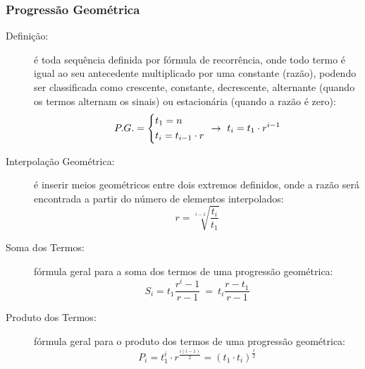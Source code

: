     \subsubsection{Progressão Geométrica}
        \begin{description}
            \item[Definição:] é toda sequência definida por fórmula de recorrência, onde todo termo é igual ao seu antecedente multiplicado por uma constante (razão), podendo ser classificada como crescente, constante, decrescente, alternante (quando os termos alternam os sinais) ou estacionária (quando a razão é zero):
            \[ P.G. = \begin{dcases} t_1 = n \\ t_i = t_{i-1} \cdot r \end{dcases} \ \rightarrow \ t_i = t_1 \cdot r^{i-1} \]
            \item[Interpolação Geométrica:] é inserir meios geométricos entre dois extremos definidos, onde a razão será encontrada a partir do número de elementos interpolados:
            \[ r = \sqrt[i-1]{\frac{t_i}{t_1}} \]
            \item[Soma dos Termos:] fórmula geral para a soma dos termos de uma progressão geométrica:
            \[ S_i = t_1 \frac{r^i -1}{r - 1} \ = \ t_i \frac{r-t_1}{r-1} \]
            \item[Produto dos Termos:] fórmula geral para o produto dos termos de uma progressão geométrica:
            \[ P_i = t_1^i \cdot r^{\frac{i(i-1)}{2}} = (t_1 \cdot t_i)^{\frac{i}{2}} \]
        \end{description}